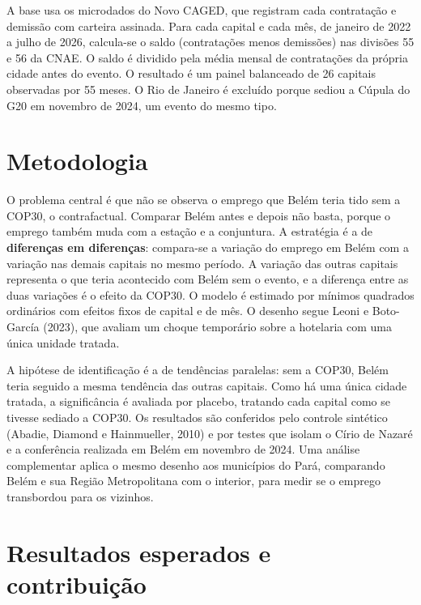 \documentclass[12pt,a4paper]{article}
\begin{document}
A base usa os microdados do Novo CAGED, que registram cada contratação e demissão com carteira
assinada. Para cada capital e cada mês, de janeiro de 2022 a julho de 2026, calcula-se o saldo (contratações
menos demissões) nas divisões 55 e 56 da CNAE. O saldo é dividido pela média mensal de contratações da própria cidade antes do evento. O resultado é
um painel balanceado de 26 capitais observadas por 55 meses. O Rio de Janeiro é excluído porque sediou
a Cúpula do G20 em novembro de 2024, um evento do mesmo tipo.

\section{Metodologia}

O problema central é que não se observa o emprego que Belém teria tido sem a COP30, o contrafactual.
Comparar Belém antes e depois não basta, porque o emprego também muda com a estação e a conjuntura. A estratégia é a de \textbf{diferenças em diferenças}: compara-se a
variação do emprego em Belém com a variação nas demais capitais no mesmo período. A variação das outras
capitais representa o que teria acontecido com Belém sem o evento, e a diferença entre as duas
variações é o efeito da COP30. O modelo é estimado por mínimos quadrados ordinários com efeitos fixos
de capital e de mês. O desenho segue Leoni e Boto-García (2023), que avaliam um
choque temporário sobre a hotelaria com uma única unidade tratada.

A hipótese de identificação é a de tendências paralelas: sem a COP30, Belém teria seguido a mesma
tendência das outras capitais. Como há uma única
cidade tratada, a significância é avaliada por placebo, tratando cada capital como se tivesse sediado
a COP30. Os resultados são
conferidos pelo controle sintético (Abadie, Diamond e Hainmueller, 2010) e por testes que isolam o
Círio de Nazaré e a conferência realizada em Belém em novembro de 2024.
Uma análise complementar aplica o mesmo desenho aos municípios do Pará, comparando Belém e sua Região
Metropolitana com o interior, para medir se o emprego transbordou para os vizinhos.

\section{Resultados esperados e contribuição}
\end{document}
